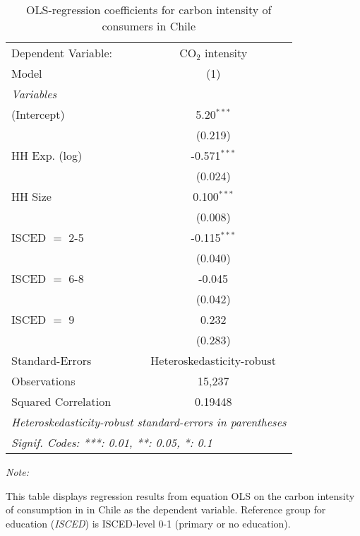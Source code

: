 
\begin{table}[htbp!]
   \centering
   \small
   \begin{adjustbox}{width = 1\textwidth, max height = 0.95\textheight, center}
      \begin{threeparttable}[b]
         \caption{\label{tab:OLS_1_CHL} OLS-regression coefficients for carbon intensity of consumers in Chile}
         \begin{tabular}{lc}
            \tabularnewline \midrule \midrule
            Dependent Variable: & CO$_{2}$ intensity\\  
            Model               & (1)\\  
            \midrule
            \emph{Variables}\\
            (Intercept)         & 5.20$^{***}$\\   
                                & (0.219)\\   
            HH Exp. (log)       & -0.571$^{***}$\\   
                                & (0.024)\\   
            HH Size             & 0.100$^{***}$\\   
                                & (0.008)\\   
            ISCED $=$ 2-5       & -0.115$^{***}$\\   
                                & (0.040)\\   
            ISCED $=$ 6-8       & -0.045\\   
                                & (0.042)\\   
            ISCED $=$ 9         & 0.232\\   
                                & (0.283)\\   
            \midrule 
            Standard-Errors     & Heteroskedasticity-robust \\   
            Observations        & 15,237\\  
            Squared Correlation & 0.19448\\  
            \midrule \midrule
            \multicolumn{2}{l}{\emph{Heteroskedasticity-robust standard-errors in parentheses}}\\
            \multicolumn{2}{l}{\emph{Signif. Codes: ***: 0.01, **: 0.05, *: 0.1}}\\
         \end{tabular}
         
         \begin{tablenotes}\item \medskip \textit{Note:}
            \item This table displays regression results from equation OLS on the carbon intensity of consumption in  in Chile as the dependent variable. Reference group for education (\textit{ISCED}) is ISCED-level 0-1 (primary or no education).
         \end{tablenotes}
      \end{threeparttable}
   \end{adjustbox}
\end{table}


